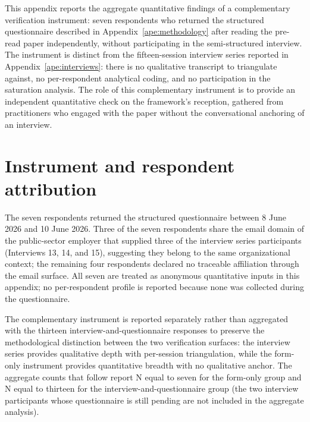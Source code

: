 
This appendix reports the aggregate quantitative findings of a complementary verification instrument: seven respondents who returned the structured questionnaire described in Appendix~\ref{ape:methodology} after reading the pre-read paper independently, without participating in the semi-structured interview. The instrument is distinct from the fifteen-session interview series reported in Appendix~\ref{ape:interviews}: there is no qualitative transcript to triangulate against, no per-respondent analytical coding, and no participation in the saturation analysis. The role of this complementary instrument is to provide an independent quantitative check on the framework's reception, gathered from practitioners who engaged with the paper without the conversational anchoring of an interview.

\section*{Instrument and respondent attribution}

The seven respondents returned the structured questionnaire between 8 June 2026 and 10 June 2026. Three of the seven respondents share the email domain of the public-sector employer that supplied three of the interview series participants (Interviews 13, 14, and 15), suggesting they belong to the same organizational context; the remaining four respondents declared no traceable affiliation through the email surface. All seven are treated as anonymous quantitative inputs in this appendix; no per-respondent profile is reported because none was collected during the questionnaire.

The complementary instrument is reported separately rather than aggregated with the thirteen interview-and-questionnaire responses to preserve the methodological distinction between the two verification surfaces: the interview series provides qualitative depth with per-session triangulation, while the form-only instrument provides quantitative breadth with no qualitative anchor. The aggregate counts that follow report N equal to seven for the form-only group and N equal to thirteen for the interview-and-questionnaire group (the two interview participants whose questionnaire is still pending are not included in the aggregate analysis).


